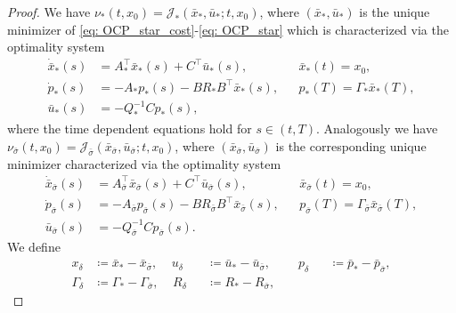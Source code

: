 \documentclass[10pt,a4paper]{amsart}
\begin{document}
\begin{proof}
    We have $\nu_*(t,x_0) = \mathcal{J}_*(\bar{x}_*,\bar{u}_*;t,x_0)$, where $(\bar{x}_*,\bar{u}_*)$ is the unique minimizer of \eqref{eq: OCP_star_cost}-\eqref{eq: OCP_star} which is characterized via the optimality system
    \begin{equation*}
    \begin{alignedat}{2}
        \dot{\bar{x}}_*(s) &= A_*^\top \bar{x}_*(s) + C^\top \bar{u}_*(s),~~~~~~~~~~
        &&\bar{x}_*(t) = x_0,\\
        \dot{p}_*(s) &= - A_* p_*(s)- BR_*B^\top \bar{x}_*(s),
        &&p_*(T) = \Gamma_* \bar{x}_*(T),\\
        \bar{u}_*(s) &= - Q_*^{-1} C p_*(s), 
    \end{alignedat}
    \end{equation*}
    where the time dependent equations hold for $s \in (t,T)$. 
    Analogously we have $\nu_{\bar{\sigma}}(t,x_0) = \mathcal{J}_{\bar{\sigma}}(\bar{x}_{\bar{\sigma}},\bar{u}_{\bar{\sigma}};t,x_0)$, where $(\bar{x}_{\bar{\sigma}},\bar{u}_{\bar{\sigma}})$ is the corresponding unique minimizer characterized via the optimality system
    \begin{equation*}
    \begin{alignedat}{2}
        \dot{\bar{x}}_{\bar{\sigma}}(s) &= A_{\bar{\sigma}}^\top \bar{x}_{\bar{\sigma}}(s) + C^\top \bar{u}_{\bar{\sigma}}(s),~~~~~~~~~~
        &&\bar{x}_{\bar{\sigma}}(t) = x_0,\\
        \dot{p}_{\bar{\sigma}}(s) &= - A_{\bar{\sigma}} p_{\bar{\sigma}}(s)- BR_{\bar{\sigma}}B^\top \bar{x}_{\bar{\sigma}}(s),
        &&p_{\bar{\sigma}}(T) = \Gamma_{\bar{\sigma}} \bar{x}_{\bar{\sigma}}(T),\\
        \bar{u}_{\bar{\sigma}}(s) &= - Q_{\bar{\sigma}}^{-1} C p_{\bar{\sigma}}(s).
    \end{alignedat}
    \end{equation*}
    We define
    \begin{equation*}
    \begin{alignedat}{3}
        x_{\delta} &\coloneqq \bar{x}_* - \bar{x}_{\bar{\sigma}},
        ~~~~~
        u_{\delta} &&\coloneqq \bar{u}_* - \bar{u}_{\bar{\sigma}},
        ~~~~~~~~~~
        p_{\delta} &&\coloneqq \bar{p}_* - \bar{p}_{\bar{\sigma}},\\
        \Gamma_{\delta} & \coloneqq \Gamma_* - \Gamma_{\bar{\sigma}},
        ~~~~~
        R_{\delta} &&\coloneqq R_* - R_{\bar{\sigma}},

\end{alignedat}
\end{equation*}
\end{proof}
\end{document}
